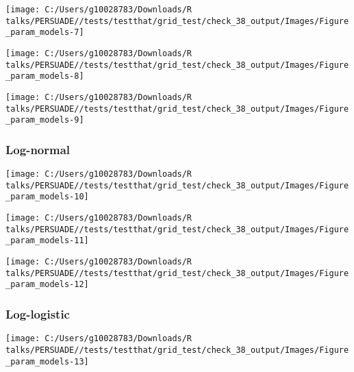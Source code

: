 \documentclass[
]{article}
\begin{document}
\begin{flushleft}\texttt{[image: C:/Users/g10028783/Downloads/R talks/PERSUADE//tests/testthat/grid\_test/check\_38\_output/Images/Figure\_param\_models-7]} \end{flushleft}

\begin{flushleft}\texttt{[image: C:/Users/g10028783/Downloads/R talks/PERSUADE//tests/testthat/grid\_test/check\_38\_output/Images/Figure\_param\_models-8]} \end{flushleft}

\begin{flushleft}\texttt{[image: C:/Users/g10028783/Downloads/R talks/PERSUADE//tests/testthat/grid\_test/check\_38\_output/Images/Figure\_param\_models-9]} \end{flushleft}

\clearpage

\subsubsection{Log-normal}\label{log-normal}

\begin{flushleft}\texttt{[image: C:/Users/g10028783/Downloads/R talks/PERSUADE//tests/testthat/grid\_test/check\_38\_output/Images/Figure\_param\_models-10]} \end{flushleft}

\begin{flushleft}\texttt{[image: C:/Users/g10028783/Downloads/R talks/PERSUADE//tests/testthat/grid\_test/check\_38\_output/Images/Figure\_param\_models-11]} \end{flushleft}

\begin{flushleft}\texttt{[image: C:/Users/g10028783/Downloads/R talks/PERSUADE//tests/testthat/grid\_test/check\_38\_output/Images/Figure\_param\_models-12]} \end{flushleft}

\clearpage

\subsubsection{Log-logistic}\label{log-logistic}

\begin{flushleft}\texttt{[image: C:/Users/g10028783/Downloads/R talks/PERSUADE//tests/testthat/grid\_test/check\_38\_output/Images/Figure\_param\_models-13]} \end{flushleft}
\end{document}
